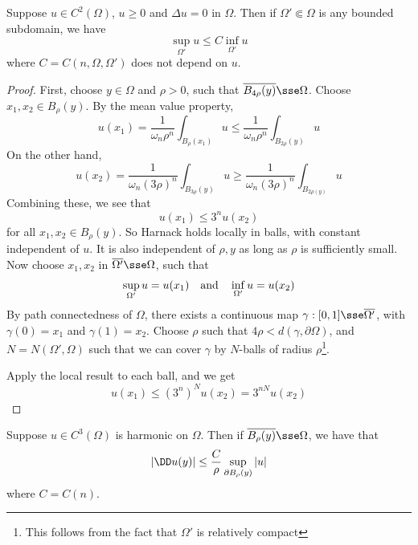 \documentclass{article}
\begin{document}
\begin{theorem}
     Suppose \(u \in C^2(\Omega)\), \(u \ge 0\) and \(\Delta u = 0\) in \(\Omega\). Then if \(\Omega' \Subset \Omega\) is any bounded subdomain, we have
    \[\sup_{\Omega'}u \le C \inf_{\Omega'}u\]
    where \(C = C(n, \Omega, \Omega')\) does not depend on \(u\).
\end{theorem}

\begin{proof}
    First, choose \(y \in \Omega\) and \(\rho > 0\), such that \(\overline{B_{4\rho}(y)} \sse \Omega\). Choose \(x_1, x_2 \in B_\rho(y)\). By the mean value property,
    \[u(x_1) = \frac{1}{\omega_n\rho^n}\int_{B_\rho(x_1)}u \le \frac{1}{\omega_n\rho^n}\int_{B_{2\rho}(y)}u\]
    On the other hand,
    \[u(x_2) = \frac{1}{\omega_n(3\rho)^n}\int_{B_{3\rho}(y)}u \ge \frac{1}{\omega_n(3\rho)^n}\int_{B_{2\rho(y)}}u\]
    Combining these, we see that
    \[u(x_1) \le 3^n u(x_2)\]
    for all \(x_1, x_2 \in B_\rho(y)\). So Harnack holds locally in balls, with constant independent of \(u\). It is also independent of \(\rho, y\) as long as \(\rho\) is sufficiently small. Now choose \(x_1, x_2\) in \(\overline{\Omega'} \sse \Omega\), such that
    \[\sup_{\Omega'}u = u(x_1) \qqtext{and} \inf_{\Omega'}u = u(x_2)\]
    By path connectedness of \(\Omega\), there exists a continuous map \(\gamma : [0, 1] \sse \overline{\Omega'}\), with \(\gamma(0) = x_1\) and \(\gamma(1) = x_2\). Choose \(\rho\) such that \(4\rho < d(\gamma, \partial\Omega)\), and \(N = N(\Omega', \Omega)\) such that we can cover \(\gamma\) by \(N\)-balls of radius \(\rho\)\footnote{This follows from the fact that \(\Omega'\) is relatively compact}.

    Apply the local result to each ball, and we get
    \[u(x_1) \le (3^n)^N u(x_2) = 3^{nN}u(x_2)\]
\end{proof}

\begin{theorem}
     Suppose \(u \in C^3(\Omega)\) is harmonic on \(\Omega\). Then if \(\overline{B_\rho(y)} \sse \Omega\), we have that
    \[\abs{\DD u(y)} \le \frac{C}{\rho}\sup_{\partial B_\rho(y)}\abs{u}\]
    where \(C = C(n)\).
\end{theorem}
\end{document}
